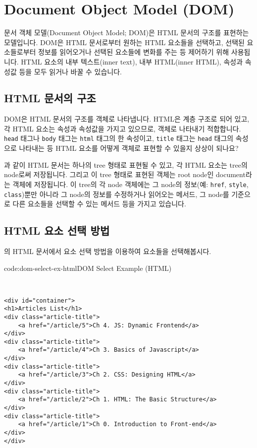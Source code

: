 \section{Document Object Model (DOM)} \label{sect:document-object-model}

문서 객체 모델(Document Object Model; DOM)은 HTML 문서의 구조를 표현하는 모델입니다. DOM은 HTML 문서로부터 원하는 HTML 요소들을 선택하고, 선택된 요소들로부터 정보를 읽어오거나 선택된 요소들에 변화를 주는 등 제어하기 위해 사용됩니다. HTML 요소의 내부 텍스트(inner text), 내부 HTML(inner HTML), 속성과 속성값 등을 모두 읽거나 바꿀 수 있습니다. 

\subsection*{HTML 문서의 구조}

DOM은 HTML 문서의 구조를 객체로 나타냅니다. HTML은 계층 구조로 되어 있고, 각 HTML 요소는 속성과 속성값을 가지고 있으므로, 객체로 나타내기 적합합니다. \texttt{head} 태그나 \texttt{body} 태그는 \texttt{html} 태그의 한 속성이고, \texttt{title} 태그는 \texttt{head} 태그의 속성으로 나타내는 등 HTML 요소를 어떻게 객체로 표현할 수 있을지 상상이 되나요?

    {}

과 같이 HTML 문서는 하나의 tree 형태로 표현될 수 있고, 각 HTML 요소는 tree의 node로써 저장됩니다. 그리고 이 tree 형태로 표현된 객체는 root node인 document라는 객체에 저장됩니다. 이 tree의 각 node 객체에는 그 node의 정보(예: \texttt{href}, \texttt{style}, \texttt{class})뿐만 아니라 그 node의 정보를 수정하거나 읽어오는 메서드, 그 node를 기준으로 다른 요소들을 선택할 수 있는 메서드 등을 가지고 있습니다. 

\subsection*{HTML 요소 선택 방법}

의 HTML 문서에서 요소 선택 방법을 이용하여 요소들을 선택해봅시다.

\begin{codeenv}{code:dom-select-ex-html}{DOM Select Example (HTML)}\begin{verbatim}


<div id="container">
<h1>Articles List</h1>
<div class="article-title">
    <a href="/article/5">Ch 4. JS: Dynamic Frontend</a>
</div>
<div class="article-title">
    <a href="/article/4">Ch 3. Basics of Javascript</a>
</div>
<div class="article-title">
    <a href="/article/3">Ch 2. CSS: Designing HTML</a>
</div>
<div class="article-title">
    <a href="/article/2">Ch 1. HTML: The Basic Structure</a>
</div>
<div class="article-title">
    <a href="/article/1">Ch 0. Introduction to Front-end</a>
</div>
</div>
\end{verbatim}
\end{codeenv}

